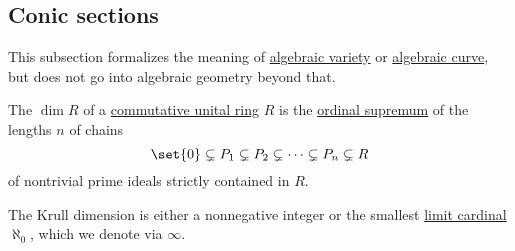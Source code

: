 \subsection{Conic sections}\label{subsec:conic_sections}

This subsection formalizes the meaning of \hyperref[def:affine_algebraic_set/variety]{algebraic variety} or \hyperref[def:affine_algebraic_set/curve]{algebraic curve}, but does not go into algebraic geometry beyond that.

\begin{definition}\label{def:krull_dimension}
  The  \( \dim R \) of a \hyperref[def:ring/commutative]{commutative unital ring} \( R \) is the \hyperref[thm:union_of_set_of_ordinals/supremum]{ordinal supremum} of the lengths \( n \) of chains
  \begin{equation*}
    \set{ 0 } \subsetneq P_1 \subsetneq P_2 \subsetneq \cdots \subsetneq P_n \subsetneq R
  \end{equation*}
  of nontrivial prime ideals strictly contained in \( R \).

  The Krull dimension is either a nonnegative integer or the smallest \hyperref[def:successor_and_limit_cardinal/weak_limit]{limit cardinal} \( \aleph_0 \), which we denote via \( \infty \).
\end{definition}

